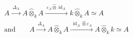 \(
\begin{gathered}
A\xrightarrow{\ \Delta_A\ }A\widehat\otimes_k A
 \xrightarrow{\ \varepsilon_A\widehat\otimes\operatorname{id}_A\ }
 k\widehat\otimes_k A\simeq A
\\[.7ex]
\text{and}\qquad
A\xrightarrow{\ \Delta_A\ }A\widehat\otimes_k A
 \xrightarrow{\ \operatorname{id}_A\widehat\otimes\varepsilon_A\ }
 A\widehat\otimes_k k\simeq A
\end{gathered}
\)

